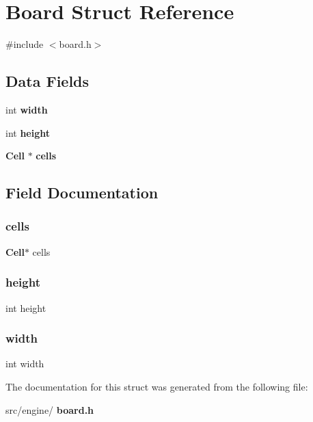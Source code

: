 \section{Board Struct Reference}
\label{structBoard}


{\ttfamily \#include $<$board.\+h$>$}

\subsection*{Data Fields}
\begin{DoxyCompactItemize}
\item 
int \textbf{ width}
\item 
int \textbf{ height}
\item 
\textbf{ Cell} $\ast$ \textbf{ cells}
\end{DoxyCompactItemize}


\subsection{Field Documentation}
\mbox{\label{structBoard_a4b2f78a0197c8d34d405912888acfe7c}} 
\subsubsection{cells}
{\footnotesize\ttfamily \textbf{ Cell}$\ast$ cells}

\mbox{\label{structBoard_ad12fc34ce789bce6c8a05d8a17138534}} 
\subsubsection{height}
{\footnotesize\ttfamily int height}

\mbox{\label{structBoard_a2474a5474cbff19523a51eb1de01cda4}} 
\subsubsection{width}
{\footnotesize\ttfamily int width}



The documentation for this struct was generated from the following file\+:\begin{DoxyCompactItemize}
\item 
src/engine/\textbf{ board.\+h}\end{DoxyCompactItemize}
